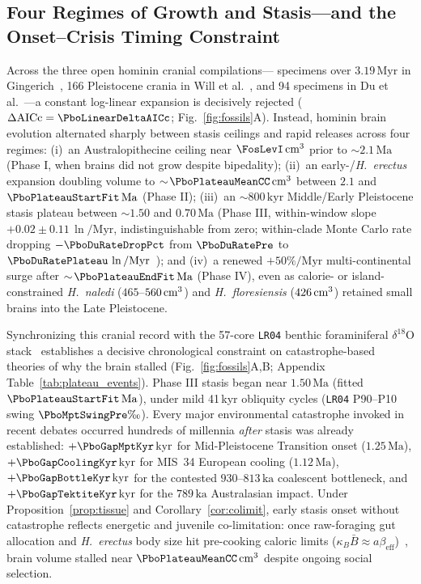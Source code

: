 \subsection{Four Regimes of Growth and Stasis---and the Onset--Crisis Timing Constraint}
Across the three open hominin cranial compilations---\FosN{} specimens over $3.19\,\mathrm{Myr}$ in Gingerich~\cite{gingerich2022}, 166 Pleistocene \Homo{} crania in Will et al.~\cite{will2021}, and 94 specimens in Du et al.~\cite{du2018}---a constant log-linear expansion is decisively rejected ($\Delta\mathrm{AICc}=\PboLinearDeltaAICc$; Fig.~\ref{fig:fossils}A). Instead, hominin brain evolution alternated sharply between stasis ceilings and rapid releases across four regimes: (i)~an Australopithecine ceiling near $\FosLevI\ccm$ prior to $\sim\!2.1\,\mathrm{Ma}$ (Phase I, when brains did not grow despite bipedality); (ii)~an early-\Homo/\textit{H.~erectus} expansion doubling volume to $\sim\!\PboPlateauMeanCC\ccm$ between $2.1$ and $\PboPlateauStartFit\,\mathrm{Ma}$ (Phase II); (iii)~an $\sim\!800\,\mathrm{kyr}$ Middle/Early Pleistocene stasis plateau between $\sim\!1.50$ and $0.70\,\mathrm{Ma}$ (Phase III, within-window slope $+0.02\pm0.11\,\ln/\mathrm{Myr}$, indistinguishable from zero; within-clade Monte Carlo rate dropping $-\PboDuRateDropPct$ from $\PboDuRatePre$ to $\PboDuRatePlateau\,\ln/\mathrm{Myr}$~\cite{du2018}); and (iv)~a renewed $+50\%/\mathrm{Myr}$ multi-continental surge after $\sim\!\PboPlateauEndFit\,\mathrm{Ma}$ (Phase IV), even as calorie- or island-constrained \textit{H.~naledi} ($465$--$560\,\text{cm}^3$) and \textit{H.~floresiensis} ($426\,\text{cm}^3$) retained small brains into the Late Pleistocene.

Synchronizing this cranial record with the 57-core \texttt{LR04} benthic foraminiferal $\delta^{18}\mathrm{O}$ stack~\cite{lisiecki2005} establishes a decisive chronological constraint on catastrophe-based theories of why the brain stalled (Fig.~\ref{fig:fossils}A,B; Appendix Table~\ref{tab:plateau_events}). Phase III stasis began near $1.50\,\mathrm{Ma}$ (fitted $\PboPlateauStartFit\,\mathrm{Ma}$), under mild 41\,kyr obliquity cycles (\texttt{LR04} P90--P10 swing $\PboMptSwingPre\text{\textperthousand}$). Every major environmental catastrophe invoked in recent debates occurred hundreds of millennia \emph{after} stasis was already established: $+\PboGapMptKyr\,\mathrm{kyr}$ for Mid-Pleistocene Transition onset ($1.25\,\mathrm{Ma}$), $+\PboGapCoolingKyr\,\mathrm{kyr}$ for MIS~34 European cooling ($1.12\,\mathrm{Ma}$), $+\PboGapBottleKyr\,\mathrm{kyr}$ for the contested $930$--$813\,\mathrm{ka}$ coalescent bottleneck, and $+\PboGapTektiteKyr\,\mathrm{kyr}$ for the $789\,\mathrm{ka}$ Australasian impact. Under Proposition~\ref{prop:tissue} and Corollary~\ref{cor:colimit}, early stasis onset without catastrophe reflects energetic and juvenile co-limitation: once raw-foraging gut allocation and \textit{H.~erectus} body size hit pre-cooking caloric limits ($\kappa_B\bar B\approx a\beta_{\mathrm{eff}}$)~\cite{aiello1995,navarrete2011,pontzer2016}, brain volume stalled near $\PboPlateauMeanCC\ccm$ despite ongoing social selection.

